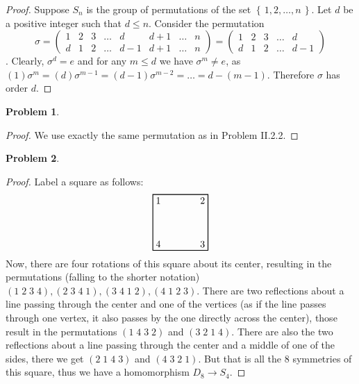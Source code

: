 \documentclass{article}
\theoremstyle{definition}
\newtheorem{problem-internal}{Problem}[subsection]
\newenvironment{problem}{
	\medskip
	\begin{problem-internal}
	}{
\end{problem-internal}
}
\newcommand{\set}[1]{\left\{\,#1\,\right\}}
\begin{document}
\begin{proof}
	Suppose $S_n$ is the group of permutations of the set $\set{1,2,\dots,n}$. Let $d$ be a positive integer such that $d \leq n$. Consider the permutation 
	\[\sigma =
	\begin{pmatrix}
		1 & 2 & 3 & \dots & d & d + 1 & \dots & n\\
		d & 1 & 2 & \dots & d - 1 & d + 1 & \dots & n
	\end{pmatrix}
	=
	\begin{pmatrix}
	1 & 2 & 3 & \dots & d\\
	d & 1 & 2 & \dots & d - 1
	\end{pmatrix}
	\].
	Clearly, $\sigma^d=e$ and for any $m \leq d$ we have $\sigma^m \neq e$, as $(1)\sigma^m=(d)\sigma^{m-1}=(d-1)\sigma^{m-2}=\dots=d-(m-1)$. Therefore $\sigma$ has order $d$.
\end{proof}

\begin{problem}
\end{problem}

\begin{proof}
	We use exactly the same permutation as in Problem II.2.2.
\end{proof}

\begin{problem}
\end{problem}

\begin{proof}
	Label a square as follows:
	\begin{equation*}
	\begin{tikzpicture}
		\node[draw=black, thick,minimum width=2cm,minimum height=2cm] (rect) at (0,0) {};
		\foreach \anc/\n in {south west/4,north west/1,north east/2,south east/3}{
			\node[anchor=\anc] at (rect.\anc) {\n};
		}
	\end{tikzpicture}
	\end{equation*}
	Now, there are four rotations of this square about its center, resulting in the permutations (falling to the shorter notation) $(1\;2\;3\;4), (2\;3\;4\;1), (3\;4\;1\;2), (4\;1\;2\;3)$. There are two reflections about a line passing through the center and one of the vertices (as if the line passes through one vertex, it also passes by the one directly across the center), those result in the permutations $(1\;4\;3\;2)$ and $(3\;2\;1\;4)$. There are also the two reflections about a line passing through the center and a middle of one of the sides, there we get $(2\;1\;4\;3)$ and $(4\;3\;2\;1)$. But that is all the $8$ symmetries of this square, thus we have a homomorphism $D_8 \to S_4$.
\end{proof}
\end{document}
